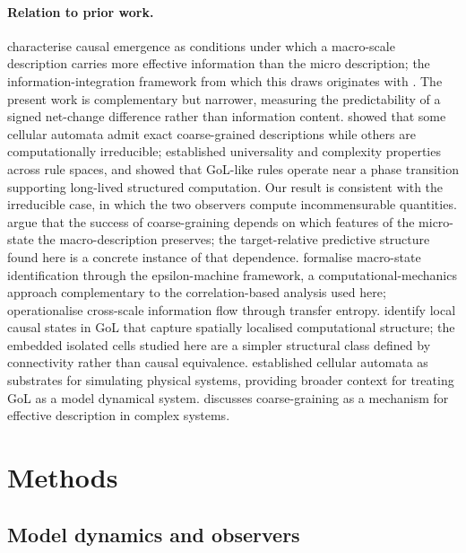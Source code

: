 \documentclass[aip,cha,preprint,nofootinbib]{revtex4-2}
\begin{document}
\paragraph{Relation to prior work.}
\citet{hoel2013} characterise causal emergence as conditions under which a
macro-scale description carries more effective information than the micro
description; the information-integration framework from which this draws
originates with \citet{tononi1994}.
The present work is complementary but narrower, measuring the predictability
of a signed net-change difference rather than information content.
\citet{israeli2004} showed that some cellular automata admit exact
coarse-grained descriptions while others are computationally irreducible;
\citet{wolfram1984} established universality and complexity properties across
rule spaces, and \citet{langton1990} showed that GoL-like rules operate near
a phase transition supporting long-lived structured computation.
Our result is consistent with the irreducible case, in which the two
observers compute incommensurable quantities.
\citet{shalizi2003} argue that the success of coarse-graining depends on
which features of the micro-state the macro-description preserves; the
target-relative predictive structure found here is a concrete instance of
that dependence.
\citet{crutchfield1989} formalise macro-state identification through
the epsilon-machine framework, a computational-mechanics approach
complementary to the correlation-based analysis used here;
\citet{schreiber2000} operationalise cross-scale information flow through
transfer entropy.
\citet{rupe2018} identify local causal states in GoL that capture spatially
localised computational structure; the embedded isolated cells studied here
are a simpler structural class defined by connectivity rather than causal
equivalence.
\citet{vichniac1984} established cellular automata as substrates for
simulating physical systems, providing broader context for treating GoL as a
model dynamical system.
\citet{flack2017} discusses coarse-graining as a mechanism for effective
description in complex systems.

\section{Methods}
\label{sec:defs}

\subsection{Model dynamics and observers}
\end{document}
